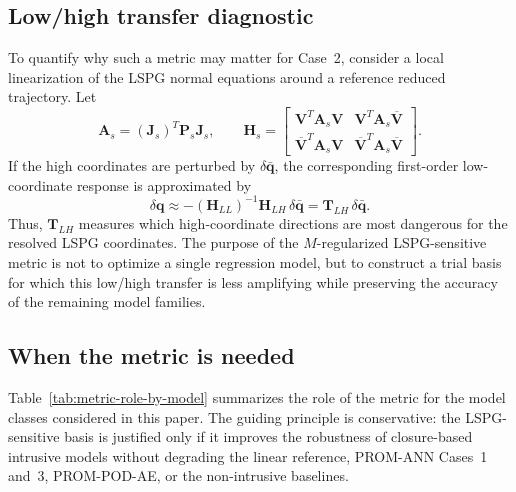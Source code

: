 \documentclass[11pt]{article}
\begin{document}
\subsection{Low/high transfer diagnostic}
To quantify why such a metric may matter for Case~2, consider a local
linearization of the LSPG normal equations around a reference reduced
trajectory. Let
\begin{equation}
\mathbf A_s=(\mathbf J_s)^T\mathbf P_s\mathbf J_s,
\qquad
\mathbf H_s=
\begin{bmatrix}
\mathbf V^T\mathbf A_s\mathbf V
&
\mathbf V^T\mathbf A_s\overline{\mathbf V}
\\
\overline{\mathbf V}^T\mathbf A_s\mathbf V
&
\overline{\mathbf V}^T\mathbf A_s\overline{\mathbf V}
\end{bmatrix}.
\end{equation}
If the high coordinates are perturbed by $\delta\bar{\mathbf q}$, the
corresponding first-order low-coordinate response is approximated by
\begin{equation}
\delta\mathbf q
\approx
-
\left(\mathbf H_{LL}\right)^{-1}\mathbf H_{LH}\,\delta\bar{\mathbf q}
=
\mathbf T_{LH}\,\delta\bar{\mathbf q}.
\label{eq:low-high-transfer}
\end{equation}
Thus, $\mathbf T_{LH}$ measures which high-coordinate directions are most
dangerous for the resolved LSPG coordinates. The purpose of the
$M$-regularized LSPG-sensitive metric is not to optimize a single regression
model, but to construct a trial basis for which this low/high transfer is less
amplifying while preserving the accuracy of the remaining model families.

\subsection{When the metric is needed}
Table~\ref{tab:metric-role-by-model} summarizes the role of the metric for the
model classes considered in this paper. The guiding principle is conservative:
the LSPG-sensitive basis is justified only if it improves the robustness of
closure-based intrusive models without degrading the linear reference,
PROM-ANN Cases~1 and~3, PROM-POD-AE, or the non-intrusive baselines.
\end{document}
